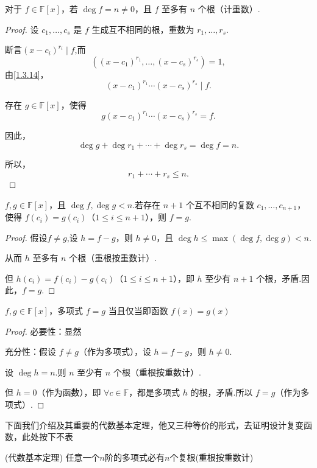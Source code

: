 \begin{lemma}
	对于 \( f \in \mathbb{F}[x] \)，若 \( \deg f = n \neq 0 \)，且 \( f \) 至多有 \( n \) 个根（计重数）.
	
\end{lemma}
\begin{proof}
	设 \( c_1, \ldots, c_s \) 是 \( f \) 生成互不相同的根，重数为 \( r_1, \ldots, r_s \).
	
	断言\((x-c_i)^{r_i}\mid f\),而
	\[ ((x - c_1)^{r_1}, \ldots, (x - c_s)^{r_s}) = 1, \]
	由\ref{1.3.14}，
	\[ (x - c_1)^{r_1} \cdots (x - c_s)^{r_s} \mid f. \]
	
	存在 \( g \in \mathbb{F}[x] \)，使得
	\[ g (x - c_1)^{r_1} \cdots (x - c_s)^{r_s} = f. \]
	
	因此，
	\[ \deg g +\deg r_1 + \cdots +\deg r_s = \deg f = n. \]
	
	所以，
	\[ r_1 + \cdots + r_s \leqslant n.\]
\end{proof}
\begin{corollary}
	\( f, g \in \mathbb{F}[x] \)，且 \( \deg f, \deg g < n \).若存在 \( n+1 \) 个互不相同的复数 \( c_1, \ldots, c_{n+1} \)，使得 \( f(c_i) = g(c_i) \)（\( 1 \leq i \leq n+1 \)），则 \( f = g \).
\end{corollary}
\begin{proof}
	 假设$f\neq g$,设 \( h = f - g \)，则 \( h \neq 0 \)，且 \( \deg h \leq \max(\deg f, \deg g) < n \).
	
	从而 \( h \) 至多有 \( n \) 个根（重根按重数计）.
	
	但 \( h(c_i) = f(c_i) - g(c_i) \)（\( 1 \leq i \leq n+1 \)），即 \( h \) 至少有 \( n+1 \) 个根，矛盾.因此，\( f = g \).
\end{proof}
\begin{corollary}
	\( f, g \in \mathbb{F}[x] \)，多项式 \( f = g \) 当且仅当即函数 \( f(x) = g(x) \)
\end{corollary}
\begin{proof}
	必要性：显然
	
	充分性：假设 \( f \neq g \)（作为多项式），设 \( h = f - g \)，则 \( h \neq 0 \).
	
	设 \( \deg h = n \).则 \( n \) 至少有 \( n \) 个根（重根按重数计）.
	
	但 \( h = 0 \)（作为函数），即 \( \forall c \in \mathbb{F} \)，都是多项式 \( h \) 的根，矛盾.所以 \( f = g \)（作为多项式）.
\end{proof}
下面我们介绍及其重要的代数基本定理，他又三种等价的形式，去证明设计复变函数，此处按下不表
\begin{theorem}(代数基本定理)\label{代数基本定理}
	任意一个$n$阶的多项式必有$n$个复根(重根按重数计)
\end{theorem}

